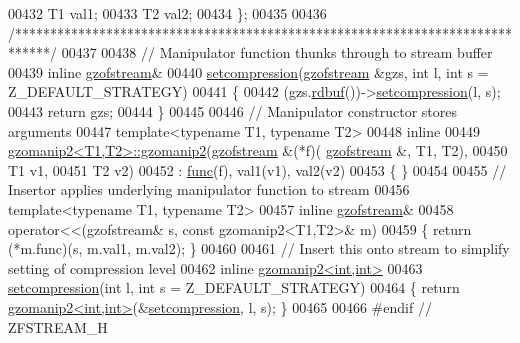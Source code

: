 \begin{DoxyCode}
00432     T1 val1;
00433     T2 val2;
00434   \};
00435 
00436 \textcolor{comment}{/*****************************************************************************/}
00437 
00438 \textcolor{comment}{// Manipulator function thunks through to stream buffer}
00439 \textcolor{keyword}{inline} \hyperlink{classgzofstream}{gzofstream}&
00440 \hyperlink{classgzfilebuf_ad109ea4fc4ca7cc19d8014b53375255d}{setcompression}(\hyperlink{classgzofstream}{gzofstream} &gzs, \textcolor{keywordtype}{int} l, \textcolor{keywordtype}{int} s = Z\_DEFAULT\_STRATEGY)
00441 \{
00442   (gzs.\hyperlink{classgzofstream_a2fef74202b114357f41cfeb28f1d2acc}{rdbuf}())->\hyperlink{classgzfilebuf_ad109ea4fc4ca7cc19d8014b53375255d}{setcompression}(l, s);
00443   \textcolor{keywordflow}{return} gzs;
00444 \}
00445 
00446 \textcolor{comment}{// Manipulator constructor stores arguments}
00447 \textcolor{keyword}{template}<\textcolor{keyword}{typename} T1, \textcolor{keyword}{typename} T2>
00448   \textcolor{keyword}{inline}
00449   \hyperlink{classgzomanip2}{gzomanip2<T1,T2>::gzomanip2}(\hyperlink{classgzofstream}{gzofstream} &(*f)(
      \hyperlink{classgzofstream}{gzofstream} &, T1, T2),
00450                               T1 v1,
00451                               T2 v2)
00452   : \hyperlink{structfunc}{func}(f), val1(v1), val2(v2)
00453   \{ \}
00454 
00455 \textcolor{comment}{// Insertor applies underlying manipulator function to stream}
00456 \textcolor{keyword}{template}<\textcolor{keyword}{typename} T1, \textcolor{keyword}{typename} T2>
00457   \textcolor{keyword}{inline} \hyperlink{classgzofstream}{gzofstream}&
00458   operator<<(gzofstream& s, const gzomanip2<T1,T2>& m)
00459   \{ \textcolor{keywordflow}{return} (*m.func)(s, m.val1, m.val2); \}
00460 
00461 \textcolor{comment}{// Insert this onto stream to simplify setting of compression level}
00462 \textcolor{keyword}{inline} \hyperlink{classgzomanip2}{gzomanip2<int,int>}
00463 \hyperlink{classgzfilebuf_ad109ea4fc4ca7cc19d8014b53375255d}{setcompression}(\textcolor{keywordtype}{int} l, \textcolor{keywordtype}{int} s = Z\_DEFAULT\_STRATEGY)
00464 \{ \textcolor{keywordflow}{return} \hyperlink{classgzomanip2}{gzomanip2<int,int>}(&\hyperlink{classgzfilebuf_ad109ea4fc4ca7cc19d8014b53375255d}{setcompression}, l, s); \}
00465 
00466 \textcolor{preprocessor}{#endif // ZFSTREAM\_H}
\end{DoxyCode}
